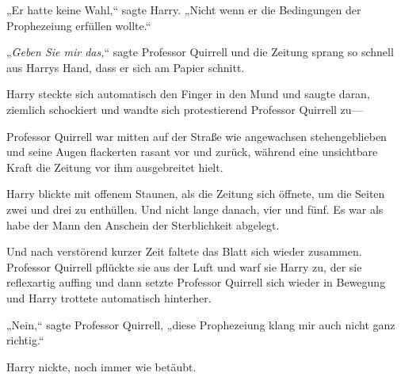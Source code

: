 „Er hatte keine Wahl,“ sagte Harry. „Nicht wenn er die Bedingungen der Prophezeiung erfüllen wollte.“

„\emph{Geben Sie mir das,}“ sagte Professor Quirrell und die Zeitung sprang so schnell aus Harrys Hand, dass er sich am Papier schnitt.

Harry steckte sich automatisch den Finger in den Mund und saugte daran, ziemlich schockiert und wandte sich protestierend Professor Quirrell zu—

Professor Quirrell war mitten auf der Straße wie angewachsen stehengeblieben und seine Augen flackerten rasant vor und zurück, während eine unsichtbare Kraft die Zeitung vor ihm ausgebreitet hielt.

Harry blickte mit offenem Staunen, als die Zeitung sich öffnete, um die Seiten zwei und drei zu enthüllen. Und nicht lange danach, vier und fünf. Es war als habe der Mann den Anschein der Sterblichkeit abgelegt.

Und nach verstörend kurzer Zeit faltete das Blatt sich wieder zusammen. Professor Quirrell pflückte sie aus der Luft und warf sie Harry zu, der sie reflexartig auffing und dann setzte Professor Quirrell sich wieder in Bewegung und Harry trottete automatisch hinterher.

„Nein,“ sagte Professor Quirrell, „diese Prophezeiung klang mir auch nicht ganz richtig.“

Harry nickte, noch immer wie betäubt.

